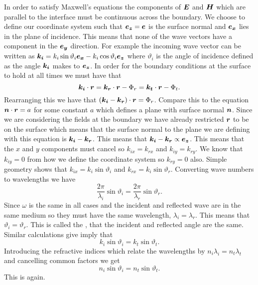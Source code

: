     In order to satisfy Maxwell's equations the components of \(\bm{E}\) and \(\bm{H}\) which are parallel to the interface must be continuous across the boundary.
    We choose to define our coordinate system such that \(\bm{e_{z}} = \bm{e}\) is the surface normal and \(\bm{e_{x}}\) lies in the plane of incidence.
    This means that none of the wave vectors have a component in the \(\bm{e_{y}}\) direction.
    For example the incoming wave vector can be written as \(\bm{k_i} = k_i\sin\vartheta_i\bm{e_{x}} - k_i\cos\vartheta_i\bm{e_{z}}\) where \(\vartheta_i\) is the angle of incidence defined as the angle \(\bm{k_i}\) makes to \(\bm{e_{z}}\).
    In order for the boundary conditions at the surface to hold at all times we must have that
    \[\bm{k_i}\cdot\bm{r} = \bm{k_r}\cdot\bm{r} - \Phi_{r} = \bm{k_t}\cdot\bm{r} - \Phi_t.\]
    Rearranging this we have that \((\bm{k_i} - \bm{k_r})\cdot\bm{r} = \Phi_r\).
    Compare this to the equation \(\bm{n}\cdot\bm{r} = a\) for some constant \(a\) which defines a plane with surface normal \(\bm{n}\).
    Since we are considering the fields at the boundary we have already restricted \(\bm{r}\) to be on the surface which means that the surface normal to the plane we are defining with this equation is \(\bm{k_i} - \bm{k_r}\).
    This means that \(\bm{k_i} - \bm{k_r} \propto \bm{e_{z}}\).
    This means that the \(x\) and \(y\) components must cancel so \(k_{ix} = k_{rx}\) and \(k_{iy} = k_{ry}\).
    We know that \(k_{iy} = 0\) from how we define the coordinate system so \(k_{ry} = 0\) also.
    Simple geometry shows that \(k_{ix} = k_i\sin\vartheta_i\) and \(k_{rx} = k_i\sin\vartheta_r\).
    Converting wave numbers to wavelengths we have
    \[\frac{2\pi}{\lambda_i} \sin\vartheta_i = \frac{2\pi}{\lambda_r}\sin\vartheta_r.\]
    Since \(\omega\) is the same in all cases and the incident and reflected wave are in the same medium so they must have the same wavelength, \(\lambda_i = \lambda_r\).
    This means that \(\vartheta_i = \vartheta_r\).
    This is called the , that the incident and reflected angle are the same.
    Similar calculations give imply that
    \[k_i\sin\vartheta_i = k_t\sin\vartheta_t.\]
    Introducing the refractive indices which relate the wavelengths by \(n_i\lambda_i = n_t\lambda_t\) and cancelling common factors we get
    \[n_i\sin\vartheta_i = n_t\sin\vartheta_t.\]
    This is  again.
    
